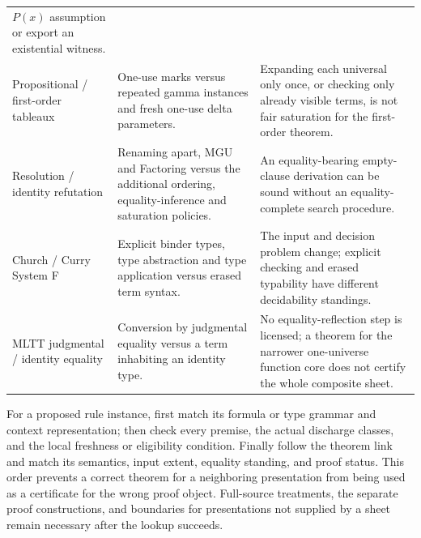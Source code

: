 \begin{longtable}{@{}p{}p{}p{}@{}}
\(P(x)\) assumption or export an existential witness. \\
Propositional / first-order tableaux & One-use marks versus repeated gamma
instances and fresh one-use delta parameters. & Expanding each universal
only once, or checking only already visible terms, is not fair saturation
for the first-order theorem. \\
Resolution / identity refutation & Renaming apart, MGU and Factoring versus
the additional ordering, equality-inference and saturation policies. &
An equality-bearing empty-clause derivation can be sound without an
equality-complete search procedure. \\
Church / Curry System F & Explicit binder types, type abstraction and
type application versus erased term syntax. & The input and decision
problem change; explicit checking and erased typability have different
decidability standings. \\
MLTT judgmental / identity equality & Conversion by judgmental equality
versus a term inhabiting an identity type. & No equality-reflection step is
licensed; a theorem for the narrower one-universe function core does not
certify the whole composite sheet. \\
\bottomrule
\end{longtable}
\endgroup

For a proposed rule instance, first match its formula or type grammar and
context representation; then check every premise, the actual discharge
classes, and the local freshness or eligibility condition.  Finally follow
the theorem link and match its semantics, input extent, equality standing,
and proof status.  This order prevents a correct theorem for a neighboring
presentation from being used as a certificate for the wrong proof object.
Full-source treatments, the separate proof constructions, and boundaries
for presentations not supplied by a sheet remain necessary after the
lookup succeeds.
